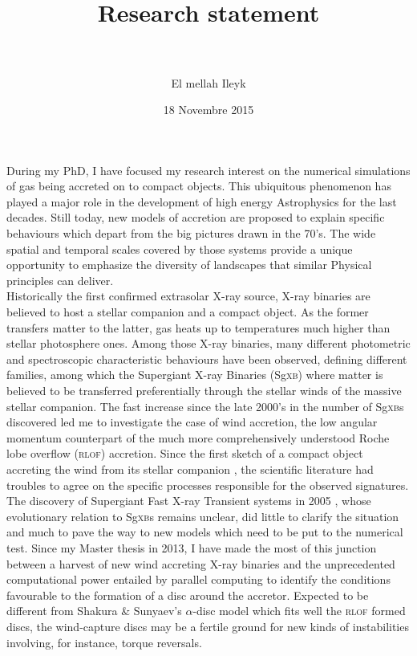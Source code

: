 \documentclass[a4paper,12pt,onecolumn]{article}
\title{	
\vspace*{-2cm}
\normalfont \normalsize 
\horrule{0.5pt} \\[0.4cm] %
\huge Research statement \\ %
\horrule{2pt} \\[0.5cm] %
}
\author{E{\sc l mellah} Ileyk} %
\date{\small 18 Novembre 2015}%
\newcommand{\ignore}[1]{}
\begin{document}


\maketitle
\thispagestyle{empty}

\indent \indent During my PhD, I have focused my research interest on the numerical simulations of gas being accreted on to compact objects. This ubiquitous phenomenon has played a major role in the development of high energy Astrophysics for the last decades. Still today, new models of accretion are proposed to explain specific behaviours which depart from the big pictures drawn in the 70's. The wide spatial and temporal scales covered by those systems provide a unique opportunity to emphasize the diversity of landscapes that similar Physical principles can deliver.\\
\indent Historically the first confirmed extrasolar X-ray source, X-ray binaries are believed to host a stellar companion and a compact object. As the former transfers matter to the latter, gas heats up to temperatures much higher than stellar photosphere ones. Among those X-ray binaries, many different photometric and spectroscopic characteristic behaviours have been observed, defining different families, among which the Supergiant X-ray Binaries (Sg\textsc{xb}) where matter is believed to be transferred preferentially through the stellar winds of the massive stellar companion. The fast increase since the late 2000's in the number of Sg\textsc{xb}s discovered \citep{Walter15} led me to investigate the case of wind accretion, the low angular momentum counterpart of the much more comprehensively understood Roche lobe overflow (\textsc{rlof}) accretion. \ignore{Their high X-ray variability suggests more powerful instabilities, possibly at the scale of the whole system. }Since the first sketch of a compact object accreting the wind from its stellar companion \citep{Illarionov1975}, the scientific literature had troubles to agree on the specific processes responsible for the observed signatures. The discovery of Supergiant Fast X-ray Transient systems \ignore{(\textsc{sfxt}s) }in 2005 \citep{Sguera2005,Sguera2006}, whose evolutionary relation to Sg\textsc{xb}s remains unclear, did little to clarify the situation and much to pave the way to new models which need to be put to the numerical test. Since my Master thesis in 2013, I have made the most of this junction between a harvest of new wind accreting X-ray binaries and the unprecedented computational power entailed by parallel computing to identify the conditions favourable to the formation of a disc around the accretor. Expected to be different from Shakura \& Sunyaev's $\alpha$-disc model \citep{Shakura1973} which fits well the \textsc{rlof} formed discs, the wind-capture discs may be a fertile ground for new kinds of instabilities involving, for instance, torque reversals.\\
\end{document}
